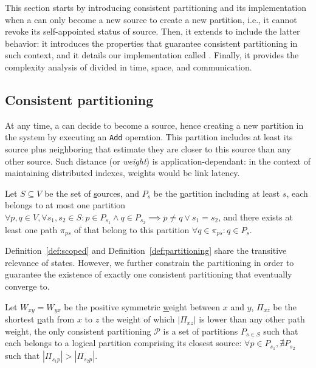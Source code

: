 \noindent This section starts by introducing consistent partitioning
and its implementation when a \process can only become a new source to
create a new partition, i.e., it cannot revoke its self-appointed
status of source. Then, it extends to include the latter behavior: it
introduces the properties that guarantee consistent partitioning in
such context, and it details our implementation called \NAME. Finally,
it provides the complexity analysis of \NAME divided in time, space,
and communication.


\subsection{Consistent partitioning}

At any time, a \process can decide to become a source, hence creating
a new partition in the system by executing an \texttt{Add}
operation. This partition includes at least its source plus
neighboring \processes that estimate they are closer to this source
than any other source. Such distance (or \emph{weight}) is
application-dependant: in the context of maintaining distributed
indexes, weights would be link latency.

\begin{definition}
  Let $S \subseteq V$ be the set of \underline{s}ources, and $P_s$ be
  the \underline{p}artition including at least \Process $s$, each
  \process belongs to at most one partition $\forall p,q \in V, \forall
  s_1,s_2 \in S: p \in P_{s_1} \wedge q \in P_{s_2} \implies p \neq q
  \vee s_1 = s_2$, and there exists at least one path $\pi_{ps}$ of
  \processes that belong to this partition $\forall q \in \pi_{ps}: q
  \in P_s$.
\end{definition}

Definition~\ref{def:scoped} and Definition~\ref{def:partitioning}
share the transitive relevance of \process states. However, we further
constrain the partitioning in order to guarantee the existence of
exactly one consistent partitioning that \processes eventually converge
to.

\begin{definition}
  Let $W_{xy} = W_{yx}$ be the positive symmetric \underline{w}eight
  between $x$ and $y$, $\Pi_{xz}$ be the shortest \underline{p}ath
  from $x$ to $z$ the weight of which $|\Pi_{xz}|$ is lower than any
  other path weight, the only consistent partitioning $\mathcal{P}$ is
  a set of partitions $P_{s\in S}$ such that each \process belongs to
  a logical partition comprising its closest source: $\forall p \in
  P_{s_1}, \nexists P_{s_2}$ such that $|\Pi_{s_1p}| > |\Pi_{s_2p}|$.
\end{definition}


